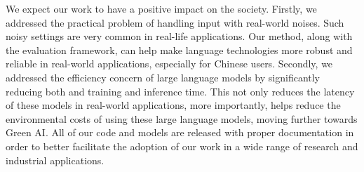 We expect our work to have a positive impact on the society. Firstly, we addressed the practical problem of handling input with real-world noises. Such noisy settings are very common in real-life applications. Our method, along with the evaluation framework, can help make language technologies more robust and reliable in real-world applications, especially for Chinese users. Secondly, we addressed the efficiency concern of large language models by significantly reducing both and training and inference time. This not only reduces the latency of these models in real-world applications, more importantly, helps reduce the environmental costs of using these large language models, moving further towards Green AI. All of our code and models are released with proper documentation in order to better facilitate the adoption of our work in a wide range of research and industrial applications. 